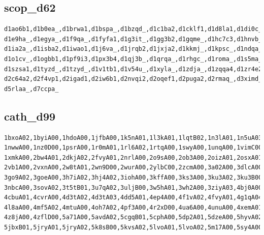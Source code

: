 \documentclass[letter,center,fleqn]{NAR}
\begin{document}
\subsection{scop\_d62}

\begin{verbatim}
d1ao6b1,d1b0ea_,d1brwa1,d1bspa_,d1bzqd_,d1c1ba2,d1cklf1,d1d8la1,d1di0c_,d1dm5c_,
d1e9ha_,d1egya_,d1f9qa_,d1fyfa1,d1g3it_,d1gg3b2,d1gqme_,d1hc7c3,d1hnvb_,d1i6hf_,
d1ia2a_,d1isba2,d1iwao1,d1j6va_,d1jrqb2,d1jxja2,d1kkmj_,d1kpsc_,d1ndqa_,d1nzwb_,
d1o1cv_,d1ogbb1,d1pf9i3,d1px3b4,d1qj3b_,d1qrqa_,d1rhgc_,d1roma_,d1s5ma_,d1srgb_,
d1szsa1,d1tyzd_,d1tzyd_,d1v1tb1,d1v54u_,d1xyla_,d1zdja_,d1zqqa4,d1zr4e2,d220la_,
d2c64a2,d2f4vp1,d2igad1,d2iw6b1,d2nvqi2,d2oqef1,d2puga2,d2rmaq_,d3ximd_,d4otaa_,
d5rlaa_,d7ccpa_
\end{verbatim}

\subsection{cath\_d99}

\begin{verbatim}
1bxoA02,1byiA00,1hdoA00,1jfbA00,1k5nA01,1l3kA01,1lqtB02,1n3lA01,1n5uA03,1nkiA00,
1nwwA00,1nz0D00,1psrA00,1r0mA01,1rl6A02,1rtqA00,1swyA00,1unqA00,1vimC00,1wmwB00,
1xmkA00,2bw4A01,2dkjA02,2fvyA01,2nrlA00,2o9sA00,2ob3A00,2oizA01,2osxA01,2rbkA01,
2vb1A00,2vxnA00,2w8tA01,2wn9D00,2wurA00,2ylbC00,2zcmA00,3a02A00,3dlcA00,3e2oA01,
3go9A02,3goeA00,3h7iA02,3hj4A02,3iohA00,3kffA00,3ks3A00,3ku3A02,3ku3B00,3lqbA00,
3nbcA00,3sovA02,3t5tB01,3u7qA02,3uljB00,3w5hA01,3wh2A00,3ziyA03,4bj0A00,4cayB00,
4cbuA01,4cvrA00,4d3tA02,4d3tA03,4dd5A01,4ep4A00,4f1vA02,4fvyA01,4g1qA04,4k8gA02,
4l8aA00,4mf5A02,4mtuA00,4oh7A02,4pf3A00,4r2xD00,4ua6A00,4unuA00,4xemA01,4yapA01,
4z8jA00,4zflD00,5a71A00,5avdA02,5cgqB01,5cphA00,5dp2A01,5dzeA00,5hyvA02,5ibnA00,
5jbxB01,5jryA01,5jryA02,5k8sB00,5kvsA02,5lvoA01,5lvoA02,5m17A00,5sy4A00
\end{verbatim}
\end{document}
